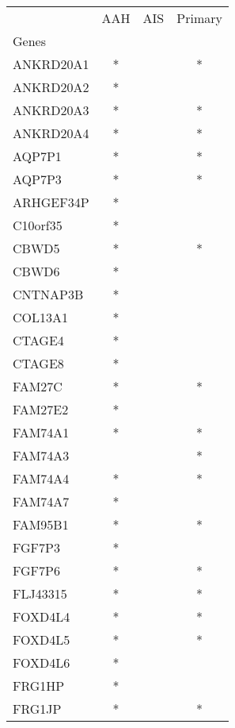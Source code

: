 \begin{tabular}{lccc}
\toprule
{} & AAH & AIS & Primary \\
Genes              &     &     &         \\
\midrule
ANKRD20A1          &   * &     &       * \\
ANKRD20A2          &   * &     &         \\
ANKRD20A3          &   * &     &       * \\
ANKRD20A4          &   * &     &       * \\
AQP7P1             &   * &     &       * \\
AQP7P3             &   * &     &       * \\
ARHGEF34P          &   * &     &         \\
C10orf35           &   * &     &         \\
CBWD5              &   * &     &       * \\
CBWD6              &   * &     &         \\
CNTNAP3B           &   * &     &         \\
COL13A1            &   * &     &         \\
CTAGE4             &   * &     &         \\
CTAGE8             &   * &     &         \\
FAM27C             &   * &     &       * \\
FAM27E2            &   * &     &         \\
FAM74A1            &   * &     &       * \\
FAM74A3            &     &     &       * \\
FAM74A4            &   * &     &       * \\
FAM74A7            &   * &     &         \\
FAM95B1            &   * &     &       * \\
FGF7P3             &   * &     &         \\
FGF7P6             &   * &     &       * \\
FLJ43315           &   * &     &       * \\
FOXD4L4            &   * &     &       * \\
FOXD4L5            &   * &     &       * \\
FOXD4L6            &   * &     &         \\
FRG1HP             &   * &     &         \\
FRG1JP             &   * &     &       * \\

\end{tabular}
